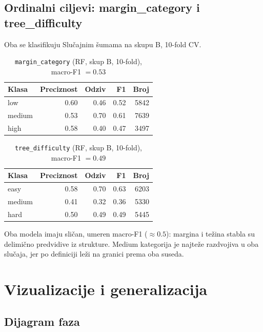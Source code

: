 \documentclass[12pt, a4paper]{article}
\begin{document}
\subsection{Ordinalni ciljevi: margin\_category i tree\_difficulty}

Oba se klasifikuju Slučajnim šumama na skupu B, 10-fold CV.

\begin{table}[H]
\centering
\caption{\texttt{margin\_category} (RF, skup B, 10-fold), macro-F1 $= 0.53$}
\begin{tabular}{lrrrr}
\toprule
\textbf{Klasa} & \textbf{Preciznost} & \textbf{Odziv} & \textbf{F1} & \textbf{Broj} \\
\midrule
low    & 0.60 & 0.46 & 0.52 & 5842 \\
medium & 0.53 & 0.70 & 0.61 & 7639 \\
high   & 0.58 & 0.40 & 0.47 & 3497 \\
\bottomrule
\end{tabular}
\end{table}

\begin{table}[H]
\centering
\caption{\texttt{tree\_difficulty} (RF, skup B, 10-fold), macro-F1 $= 0.49$}
\begin{tabular}{lrrrr}
\toprule
\textbf{Klasa} & \textbf{Preciznost} & \textbf{Odziv} & \textbf{F1} & \textbf{Broj} \\
\midrule
easy   & 0.58 & 0.70 & 0.63 & 6203 \\
medium & 0.41 & 0.32 & 0.36 & 5330 \\
hard   & 0.50 & 0.49 & 0.49 & 5445 \\
\bottomrule
\end{tabular}
\end{table}

Oba modela imaju sličan, umeren macro-F1 ($\approx 0.5$): margina i težina stabla su
delimično predvidive iz strukture. Medium kategorija je
najteže razdvojiva u oba slučaja, jer po definiciji leži na granici prema oba suseda.

\section{Vizualizacije i generalizacija}

\subsection{Dijagram faza}
\end{document}
